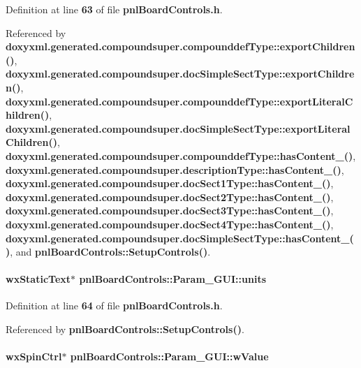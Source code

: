 Definition at line {\bf 63} of file {\bf pnl\+Board\+Controls.\+h}.



Referenced by {\bf doxyxml.\+generated.\+compoundsuper.\+compounddef\+Type\+::export\+Children()}, {\bf doxyxml.\+generated.\+compoundsuper.\+doc\+Simple\+Sect\+Type\+::export\+Children()}, {\bf doxyxml.\+generated.\+compoundsuper.\+compounddef\+Type\+::export\+Literal\+Children()}, {\bf doxyxml.\+generated.\+compoundsuper.\+doc\+Simple\+Sect\+Type\+::export\+Literal\+Children()}, {\bf doxyxml.\+generated.\+compoundsuper.\+compounddef\+Type\+::has\+Content\+\_\+()}, {\bf doxyxml.\+generated.\+compoundsuper.\+description\+Type\+::has\+Content\+\_\+()}, {\bf doxyxml.\+generated.\+compoundsuper.\+doc\+Sect1\+Type\+::has\+Content\+\_\+()}, {\bf doxyxml.\+generated.\+compoundsuper.\+doc\+Sect2\+Type\+::has\+Content\+\_\+()}, {\bf doxyxml.\+generated.\+compoundsuper.\+doc\+Sect3\+Type\+::has\+Content\+\_\+()}, {\bf doxyxml.\+generated.\+compoundsuper.\+doc\+Sect4\+Type\+::has\+Content\+\_\+()}, {\bf doxyxml.\+generated.\+compoundsuper.\+doc\+Simple\+Sect\+Type\+::has\+Content\+\_\+()}, and {\bf pnl\+Board\+Controls\+::\+Setup\+Controls()}.

\paragraph[{units}]{\setlength{\rightskip}{0pt plus 5cm}wx\+Static\+Text$\ast$ pnl\+Board\+Controls\+::\+Param\+\_\+\+G\+U\+I\+::units}\label{classpnlBoardControls_1_1Param__GUI_afb3c482bbca211f9844358c92adec6ff}


Definition at line {\bf 64} of file {\bf pnl\+Board\+Controls.\+h}.



Referenced by {\bf pnl\+Board\+Controls\+::\+Setup\+Controls()}.

\paragraph[{w\+Value}]{\setlength{\rightskip}{0pt plus 5cm}wx\+Spin\+Ctrl$\ast$ pnl\+Board\+Controls\+::\+Param\+\_\+\+G\+U\+I\+::w\+Value}\label{classpnlBoardControls_1_1Param__GUI_a1f01f58b10d4aa722edc46d88f8cdb2c}


